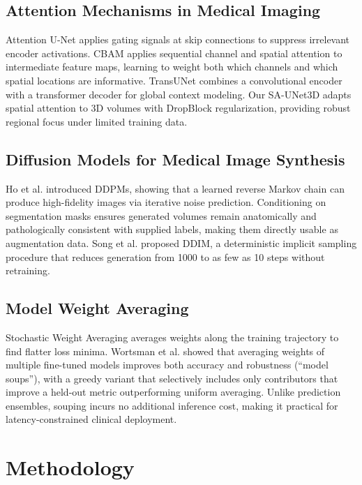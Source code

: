\documentclass[conference]{IEEEtran}
\begin{document}
\subsection{Attention Mechanisms in Medical Imaging}

Attention U-Net \cite{b12} applies gating signals at skip
connections to suppress irrelevant encoder activations. CBAM
\cite{b10} applies sequential channel and spatial attention to
intermediate feature maps, learning to weight both which channels
and which spatial locations are informative. TransUNet \cite{b14}
combines a convolutional encoder with a transformer decoder for
global context modeling. Our SA-UNet3D adapts spatial attention to
3D volumes with DropBlock \cite{b13} regularization, providing
robust regional focus under limited training data.

\subsection{Diffusion Models for Medical Image Synthesis}

Ho et al. \cite{b7} introduced DDPMs, showing that a learned
reverse Markov chain can produce high-fidelity images via
iterative noise prediction. Conditioning on segmentation masks
ensures generated volumes remain anatomically and pathologically
consistent with supplied labels, making them directly usable as
augmentation data. Song et al. \cite{b8} proposed DDIM, a
deterministic implicit sampling procedure that reduces generation
from 1000 to as few as 10 steps without retraining.

\subsection{Model Weight Averaging}

Stochastic Weight Averaging averages weights along the training
trajectory to find flatter loss minima. Wortsman et al. \cite{b9}
showed that averaging weights of multiple fine-tuned models
improves both accuracy and robustness (``model soups''), with a
greedy variant that selectively includes only contributors that
improve a held-out metric outperforming uniform averaging. Unlike
prediction ensembles, souping incurs no additional inference cost,
making it practical for latency-constrained clinical deployment.

\section{Methodology}
\end{document}
